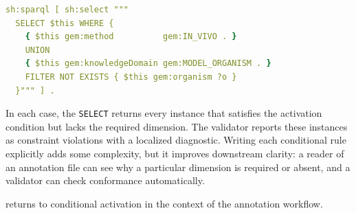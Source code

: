 \begin{lstlisting}[language=yaml, caption={Compact form of the conditional-activation shape for \emph{Organism}. The disjunction is expressed by a SPARQL \texttt{UNION} whose two branches refer to different dimensions.}, label={lst:shacl-org}]
sh:sparql [ sh:select """
  SELECT $this WHERE {
    { $this gem:method          gem:IN_VIVO . }
    UNION
    { $this gem:knowledgeDomain gem:MODEL_ORGANISM . }
    FILTER NOT EXISTS { $this gem:organism ?o }
  }""" ] .
\end{lstlisting}

In each case, the \texttt{SELECT} returns every \GeneticEvidence{}
instance that satisfies the activation condition but lacks the required
dimension. The validator reports these instances as constraint violations
with a localized diagnostic. Writing each conditional rule explicitly adds
some complexity, but it improves downstream clarity: a reader of an
annotation file can see why a particular dimension is required or absent,
and a validator can check conformance automatically.

 returns to conditional activation in the context of
the annotation workflow.

